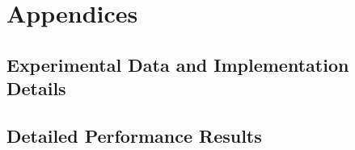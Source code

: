 
\chapter{Appendices}\label{ch:appendices}

\section{Experimental Data and Implementation Details}

\section{Detailed Performance Results}


